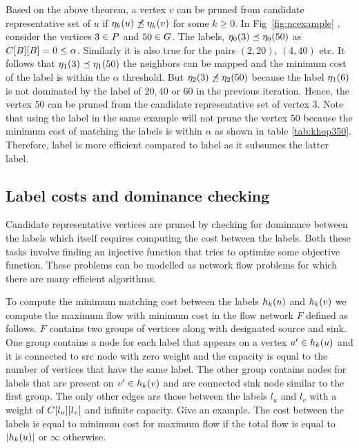 Based on the above theorem, a vertex $v$ can be pruned from candidate
representative set of $u$ if $\eta_{k}(u) \not\preceq \eta_{k}(v)$
for some $k \geq 0$. In Fig~\ref{fig:ncexample} , consider the vertices
$3 \in P$ and $50 \in G$. The \ncl labels, 
$\eta_{0}(3) \preceq \eta_{0}(50)$ as ${C}[B][B] = 0 \leq \alpha$.
Similarly it is also true for the pairs $(2, 20)$, $(4, 40)$ etc. It follows
that $\eta_{1}(3) \preceq \eta_{1}(50)$ the neighbors can be mapped and
the minimum cost of the \khop label is within the $\alpha$ threshold. But
$\eta_{2}(3) \not\preceq \eta_{2}(50)$ because the \ncl label
$\eta_{1}(6)$ is not dominated by the \ncl label
of $20, 40$ or  $60$ in the previous iteration. Hence, the vertex $50$
can be pruned from the candidate representative set of vertex $3$.
Note that using the \khop label in the same example will not prune the
vertex $50$ because the minimum cost of matching the \khop labels is within
$\alpha$ as shown in table \ref{tab:khop350}. Therefore, \ncl label is more
efficient compared to \khop label as it subsumes the latter label.

\subsection{Label costs and dominance checking}
Candidate representative vertices are pruned by checking for dominance between
the \ncl labels which itself requires computing the cost between the \khop labels.
Both these tasks involve finding an injective function that tries to optimize
some objective function. These problems can be modelled as network flow problems
for which there are many efficient algorithms. 

 To compute the minimum
matching cost between the \khop labels
$h_{k}(u)$ and $h_{k}(v)$ we compute the maximum flow with minimum
cost in the flow network $F$ defined as follows. $F$ contains two groups of
vertices along with designated source and sink. One group contains a node for
each label that appears on a vertex $u' \in h_{k}(u)$ and it is connected
to src node with zero weight and the capacity is equal to the number of 
vertices that have the same label. The other group contains nodes
for labels that are present on $v' \in h_{k}(v)$ and are connected sink 
node similar to the first group. The only other edges are those between the
labels $l_u$ and $l_v$ with a weight of ${C}[l_u][l_v]$ and infinite 
capacity. Give an example. The cost between the \khop labels is equal to
minimum cost for maximum flow if the total flow is equal to $|h_{k}(u)|$ or 
$\infty$ otherwise.

